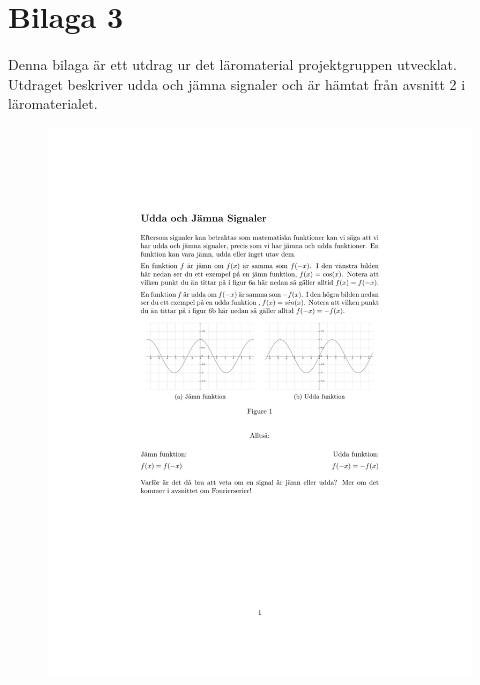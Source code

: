 \documentclass[12pt,a4paper,twoside,openright]{article}
\begin{document}
\section{Bilaga 3}
\label{bil:3}
Denna bilaga är ett utdrag ur det läromaterial projektgruppen
utvecklat. Utdraget beskriver udda och jämna signaler och är hämtat
från avsnitt 2 i läromaterialet.
\begin{figure}
  \centerline{\includegraphics[page=1]{Bilagor/Bilaga3.pdf}}
\end{figure}
\end{document}
